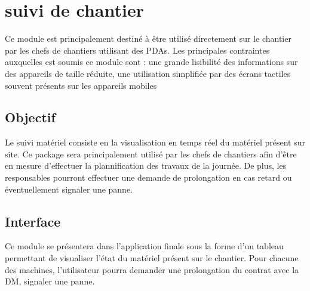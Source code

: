 \section {suivi de chantier}

Ce module est principalement destiné à être utilisé directement sur le chantier par les chefs de chantiers utilisant des PDAs.
Les principales contraintes auxquelles est soumis ce module sont : 
une grande lisibilité des informations sur des appareils de taille réduite, une utilisation simplifiée par des écrans tactiles souvent présents sur les appareils mobiles

	\subsection {Objectif}
	Le suivi matériel consiste en la visualisation en temps réel du matériel présent sur site. 
	Ce package sera principalement utilisé par les chefs de chantiers afin d'être en mesure d'effectuer la plannification des travaux de la journée.
	De plus, les responsables pourront effectuer une demande de prolongation en cas retard ou éventuellement signaler une panne.

	\subsection {Interface}
	Ce module se présentera dans l'application finale sous la forme d'un tableau permettant de visualiser l'état du matériel présent sur le chantier. 
	Pour chacune des machines, l'utilisateur pourra demander une prolongation du contrat avec la DM, signaler une panne.


